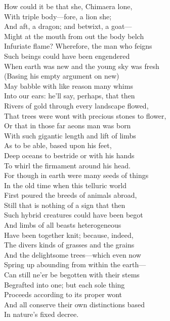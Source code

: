 How could it be that she, Chimaera lone,\\
With triple body—fore, a lion she;\\
And aft, a dragon; and betwixt, a goat—\\
Might at the mouth from out the body belch\\
Infuriate flame? Wherefore, the man who feigns\\
Such beings could have been engendered\\
When earth was new and the young sky was fresh\\
(Basing his empty argument on new)\\
May babble with like reason many whims\\
Into our ears: he'll say, perhaps, that then\\
Rivers of gold through every landscape flowed,\\
That trees were wont with precious stones to flower,\\
Or that in those far aeons man was born\\
With such gigantic length and lift of limbs\\
As to be able, based upon his feet,\\
Deep oceans to bestride or with his hands\\
To whirl the firmament around his head.\\
For though in earth were many seeds of things\\
In the old time when this telluric world\\
First poured the breeds of animals abroad,\\
Still that is nothing of a sign that then\\
Such hybrid creatures could have been begot\\
And limbs of all beasts heterogeneous\\
Have been together knit; because, indeed,\\
The divers kinds of grasses and the grains\\
And the delightsome trees—which even now\\
Spring up abounding from within the earth—\\
Can still ne'er be begotten with their stems\\
Begrafted into one; but each sole thing\\
Proceeds according to its proper wont\\
And all conserve their own distinctions based\\
In nature's fixed decree.

